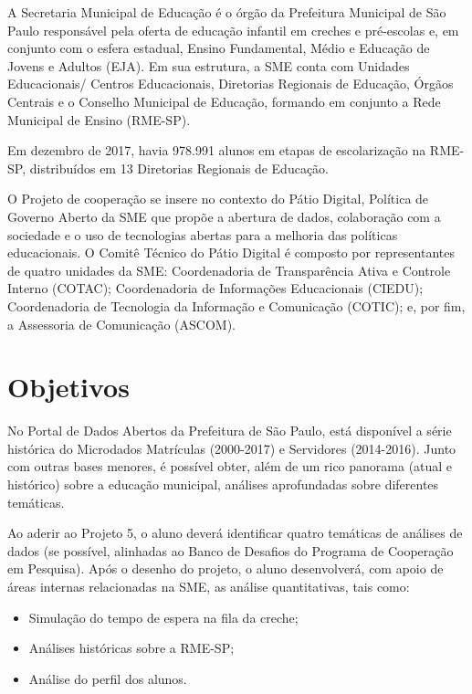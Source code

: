 \documentclass{article}
\begin{document}
A Secretaria Municipal de Educação é o órgão da Prefeitura Municipal de São Paulo responsável pela oferta de educação infantil em creches e pré-escolas e, em conjunto com o esfera estadual, Ensino Fundamental, Médio e Educação de Jovens e Adultos (EJA). Em sua estrutura, a SME conta com Unidades Educacionais/ Centros Educacionais, Diretorias Regionais de Educação, Órgãos Centrais e o Conselho Municipal de Educação, formando em conjunto a Rede Municipal de Ensino (RME-SP).

Em dezembro de 2017, havia 978.991 alunos em etapas de escolarização na RME-SP, distribuídos em 13 Diretorias Regionais de Educação. 

O Projeto de cooperação se insere no contexto do Pátio Digital, Política de Governo Aberto da SME que propõe a abertura de dados, colaboração com a sociedade e o uso de tecnologias abertas para a melhoria das políticas educacionais. O Comitê Técnico do Pátio Digital é composto por representantes de quatro unidades da SME: Coordenadoria de Transparência Ativa e Controle Interno (COTAC); Coordenadoria de Informações Educacionais (CIEDU); Coordenadoria de Tecnologia da Informação e Comunicação (COTIC); e, por fim, a Assessoria de Comunicação (ASCOM). 

\section{Objetivos}

No Portal de Dados Abertos da Prefeitura de São Paulo, está disponível a série histórica do Microdados Matrículas (2000-2017) e Servidores (2014-2016). Junto com outras bases menores, é possível obter, além de um rico panorama (atual e histórico) sobre a educação municipal, análises aprofundadas sobre diferentes temáticas. 

Ao aderir ao Projeto 5, o aluno deverá identificar quatro temáticas de análises de dados (se possível, alinhadas ao Banco de Desafios do Programa de Cooperação em Pesquisa). Após o desenho do projeto, o aluno desenvolverá, com apoio de áreas internas relacionadas na SME, as análise quantitativas, tais como: 

\begin{itemize}
\item Simulação do tempo de espera na fila da creche;
\item Análises históricas sobre a RME-SP;
\item Análise do perfil dos alunos.
\end{itemize}
\end{document}

